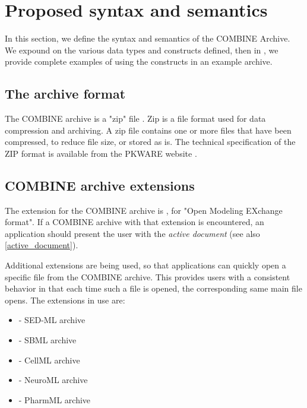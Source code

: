 
\section{Proposed syntax and semantics}
\label{syntax}

In this section, we define the syntax and semantics of the COMBINE 
Archive. We expound on the various data types and constructs defined, 
then in , we provide complete examples of using the 
constructs in an example archive. 



\subsection{The archive format}
The COMBINE archive is a "zip" file \cite{zipFile}. Zip is a file format 
used for data compression and archiving. A zip file contains one or more 
files that have been compressed, to reduce file size, or stored as is. 
The technical specification of the ZIP format is available from the 
PKWARE website \cite{zipSpec}. 


\subsection{COMBINE archive extensions}
\label{combine-archive-extensions}
The extension for the COMBINE archive is , for "{O}pen 
{M}odeling {EX}change format". If a COMBINE archive with that extension 
is encountered, an application should present the user with the 
\textit{active document} (see also \ref{active_document}). 


Additional extensions are being used, so that applications can quickly 
open a specific file from the COMBINE archive. This provides users with 
a consistent behavior in that each time such a file is opened, the 
corresponding same main file opens. The extensions in use are: 


\begin{itemize}
	\item { - SED-ML archive}
	\item { - SBML archive}
	\item { - CellML archive}
	\item { - NeuroML archive}
	\item { - PharmML archive}
\end{itemize}


